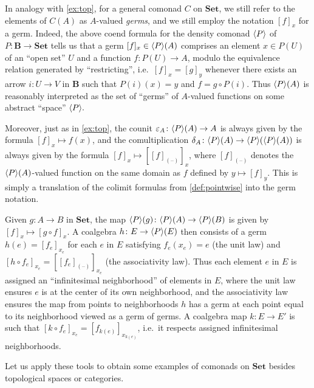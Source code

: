 \documentclass[11pt, oneside, article]{memoir}
\theoremstyle{plain}
\theoremstyle{definition}
\theoremstyle{remark}
\newenvironment{remark}
{\renewcommand\qedsymbol{$\lrcorner$}%
  \pushQED{\qed}\myremark}
{\popQED\endmyremark}
\DeclarePairedDelimiter{\gen}{\langle}{\rangle}
\newcommand{\dash}{{\mathord{\text{--}}}}
\newcommand{\namedcat}[1]{\mathbf{#1}}
\newcommand{\cat}[1]{\mathbf{#1}}
\newcommand{\Set}{\namedcat{Set}}
\newcommand{\ph}[1]{#1}
\newcommand{\cmnd}[1]{{#1}}
\newcommand{\eE}{E}
\newcommand{\xA}{A}
\newcommand{\xB}{B}
\newcommand{\xU}{U}
\newcommand{\xV}{V}
\newcommand{\hK}{k}
\newcommand{\hH}{h}
\newcommand{\cC}{\cmnd{C}}
\newcommand{\bB}{\cat{B}}
\newcommand{\pP}{\ph{P}}
\newcommand{\cP}{\gen{\pP}}
\begin{document}
\begin{remark}\label{rem:densitygerms}
  In analogy with \cref{ex:top}, for a general comonad $\cC$ on
  $\Set$, we still refer to the elements of $\cC(\xA)$ as $\xA$-valued
  \emph{germs}, and we still employ the notation $[f]_x$ for a
  germ. Indeed, the above coend formula for the density comonad $\cP$
  of $\pP \colon \bB \to \Set$ tells us that a germ
  $[f]_x \in \cP(\xA)$ comprises an element $x \in \pP(U)$ of an
  ``open set'' $\xU$ and a function $f \colon \pP(\xU) \to \xA$,
  modulo the equivalence relation generated by ``restricting'', i.e.\
  $[f]_x = [g]_y$ whenever there exists an arrow
  $i \colon \xU \to \xV$ in $\bB$ such that $\pP(i)(x) = y$ and
  $f = g\circ \pP(i)$. Thus $\cP(\xA)$ is reasonably interpreted as
  the set of ``germs'' of $\xA$-valued functions on some abstract
  ``space'' $\cP.$

  Moreover, just as in \cref{ex:top}, the counit
  $\varepsilon_\xA \colon \cP(\xA) \to \xA$ is always given by the
  formula $[f]_x \mapsto f(x)$, and the comultiplication
  $\delta_\xA \colon \cP(\xA) \to \cP(\cP(\xA))$ is always given by
  the formula $[f]_x \mapsto [[f]_{(\dash)}]_x$, where $[f]_{(\dash)}$
  denotes the $\cP(\xA)$-valued function on the same domain as $f$
  defined by $y \mapsto [f]_y$. This is simply a translation of the
  colimit formulas from \cref{def:pointwise} into the germ
  notation.

  Given $g \colon \xA \to \xB$ in $\Set$, the map
  $\cP(g) \colon \cP(\xA) \to \cP(\xB)$ is given by
  $[f]_x \mapsto [g\circ f]_x$. A coalgebra
  $\hH \colon \eE \to \cP(\eE)$ then consists of a germ
  $\hH(e) = [f_e]_{x_e}$ for each $e$ in $\eE$ satisfying
  $f_e(x_e) = e$ (the unit law) and
  $[\hH \circ f_e]_{x_e} = [[f_e]_{(\dash)}]_{x_e}$ (the associativity
  law). Thus each element $e$ in $\eE$ is assigned an ``infinitesimal
  neighborhood'' of elements in $\eE$, where the unit law ensures $e$
  is at the center of its own neighborhood, and the associativity law
  ensures the map from points to neighborhoods $\hH$ has a germ at
  each point equal to its neighborhood viewed as a germ of germs. A
  coalgebra map $\hK \colon \eE \to \eE'$ is such that
  $[\hK \circ f_e]_{x_e} = [f_{\hK(e)}]_{x_{\hK(e)}}$, i.e.\
  it respects assigned infinitesimal neighborhoods.
\end{remark}

Let us apply these tools to obtain some examples of comonads on $\Set$
besides topological spaces or categories.
\end{document}
